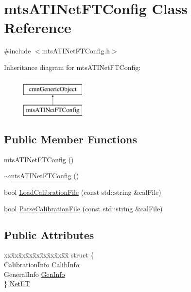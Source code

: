 \hypertarget{classmts_a_t_i_net_f_t_config}{}\section{mts\+A\+T\+I\+Net\+F\+T\+Config Class Reference}
\label{classmts_a_t_i_net_f_t_config}


{\ttfamily \#include $<$mts\+A\+T\+I\+Net\+F\+T\+Config.\+h$>$}

Inheritance diagram for mts\+A\+T\+I\+Net\+F\+T\+Config\+:\begin{figure}[H]
\begin{center}
\leavevmode
\includegraphics[height=2.000000cm]{de/d7d/classmts_a_t_i_net_f_t_config}
\end{center}
\end{figure}
\subsection*{Public Member Functions}
\begin{DoxyCompactItemize}
\item 
\hyperlink{classmts_a_t_i_net_f_t_config_acde645f416f4db3de15efb0e01a6b088}{mts\+A\+T\+I\+Net\+F\+T\+Config} ()
\item 
\hyperlink{classmts_a_t_i_net_f_t_config_a3c3c637e2eb6fffeffb83b0bdc3cf5b6}{$\sim$mts\+A\+T\+I\+Net\+F\+T\+Config} ()
\item 
bool \hyperlink{classmts_a_t_i_net_f_t_config_acdb1e00147a03abf4453f9e7c4ab3835}{Load\+Calibration\+File} (const std\+::string \&cal\+File)
\item 
bool \hyperlink{classmts_a_t_i_net_f_t_config_a1c6b1f80185f59b081d6266e0f5d7714}{Parse\+Calibration\+File} (const std\+::string \&cal\+File)
\end{DoxyCompactItemize}
\subsection*{Public Attributes}
\begin{DoxyCompactItemize}
\item 
\begin{tabbing}
xx\=xx\=xx\=xx\=xx\=xx\=xx\=xx\=xx\=\kill
struct \{\\
\>CalibrationInfo \hyperlink{classmts_a_t_i_net_f_t_config_a8a79d092fb24d610b055aca16680e749}{CalibInfo}\\
\>GeneralInfo \hyperlink{classmts_a_t_i_net_f_t_config_a683259eee30c2156fe2e46bb34caa4eb}{GenInfo}\\
\} \hyperlink{classmts_a_t_i_net_f_t_config_a728e56c02c4ba7f270035158419062df}{NetFT}\\

\end{tabbing}\end{DoxyCompactItemize}
